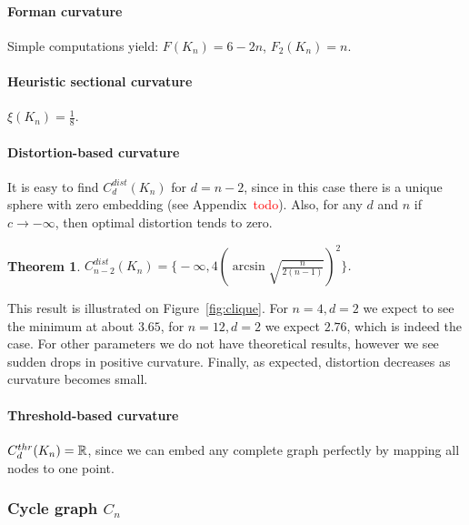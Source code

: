 \documentclass{article} %
\newtheorem{theorem}{Theorem}[section]
\begin{document}
\paragraph{Forman curvature} 
Simple computations yield:
$F(K_n) = 6 - 2n$, $F_2(K_n) = n$.

\paragraph{Heuristic sectional curvature} 
$\xi(K_n) = \frac{1}{8}$.

\paragraph{Distortion-based curvature}

It is easy to find $C_d^{dist}(K_n)$ for $d = n-2$, since in this case there is a unique sphere with zero embedding (see Appendix~\textcolor{red}{todo}). Also, for any $d$ and $n$ if $c \to -\infty$, then optimal distortion tends to zero.

\begin{theorem}\label{thm:clique_distortion}
$C_{n-2}^{dist}(K_n) = \bigg\{-\infty,  4 \left(\arcsin \sqrt{\frac{n}{2(n-1)}}\right)^2\bigg\}$.
\end{theorem}

This result is illustrated on Figure~\ref{fig:clique}. For $n = 4, d = 2$ we expect to see the minimum at about $3.65$, for $n = 12, d = 2$ we expect $2.76$, which is indeed the case. For other parameters we do not have theoretical results, however we see sudden drops in positive curvature. Finally, as expected, distortion decreases as curvature becomes small. 

\paragraph{Threshold-based curvature} 
$C_d^{thr}(K_n) = \mathbb{R}$, since we can embed any complete graph perfectly by mapping all nodes to one point. 

\subsubsection{Cycle graph $C_n$} 
\end{document}
